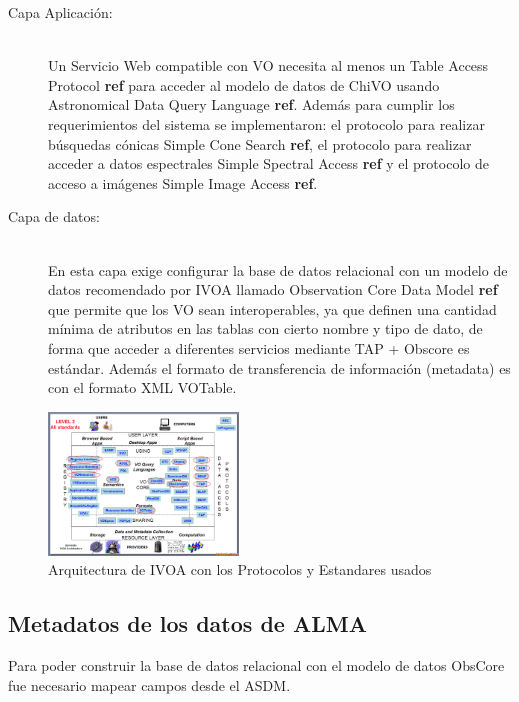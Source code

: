 \begin{description}
    \item[Capa Aplicación:] \hfill \\
        Un Servicio Web compatible con VO necesita al menos un Table Access Protocol
        \textbf{ref} para acceder al modelo de datos de ChiVO usando Astronomical
        Data Query Language \textbf{ref}. Además para cumplir los requerimientos del
        sistema se implementaron: el protocolo para realizar búsquedas cónicas
        Simple Cone Search \textbf{ref}, el protocolo para realizar acceder a datos
        espectrales Simple Spectral Access \textbf{ref} y el protocolo de acceso a
        imágenes Simple Image Access \textbf{ref}.

    \item[Capa de datos:] \hfill \\
        En esta capa exige configurar la base de datos relacional con un modelo de
        datos recomendado por IVOA llamado Observation Core Data Model \textbf{ref}
        que permite que los VO sean interoperables, ya que definen una cantidad
        mínima de atributos en las tablas con cierto nombre y tipo de dato, de forma
        que acceder a diferentes servicios mediante TAP + Obscore es estándar.
        Además el formato de transferencia de información (metadata) es con el
        formato XML VOTable.
\end{description}

\begin{figure}[h]
    \centering
    \includegraphics[width=0.45\textwidth]{images/arquitectura_2.png}
    \caption{Arquitectura de IVOA con los Protocolos y Estandares usados}
    \label{fig:ivoarch}
\end{figure}

\subsection{Metadatos de los datos de ALMA}

Para poder construir la base de datos relacional con el modelo de datos ObsCore fue
necesario mapear campos desde el ASDM.

